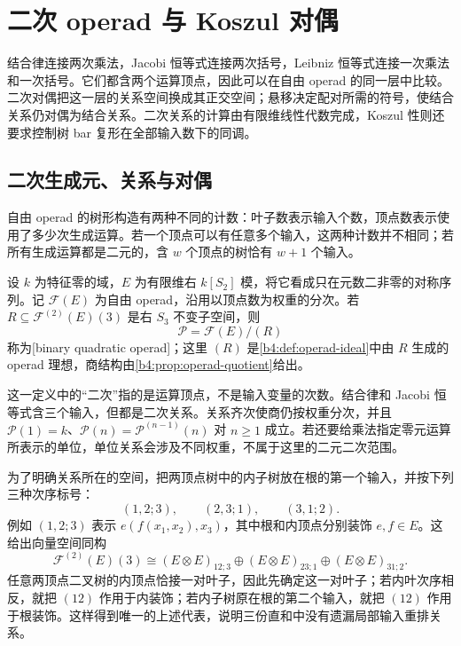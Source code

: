 
\section{二次 operad 与 Koszul 对偶}
\label{b4:sec:G03}

结合律连接两次乘法，Jacobi 恒等式连接两次括号，Leibniz 恒等式连接一次乘法和一次括号。它们都含两个运算顶点，因此可以在自由 operad 的同一层中比较。二次对偶把这一层的关系空间换成其正交空间；悬移决定配对所需的符号，使结合关系仍对偶为结合关系。二次关系的计算由有限维线性代数完成，Koszul 性则还要求控制树 bar 复形在全部输入数下的同调。

\subsection{二次生成元、关系与对偶}
\label{b4:subsec:G03:01}

自由 operad 的树形构造有两种不同的计数：叶子数表示输入个数，顶点数表示使用了多少次生成运算。若一个顶点可以有任意多个输入，这两种计数并不相同；若所有生成运算都是二元的，含 \(w\) 个顶点的树恰有 \(w+1\) 个输入。

\begin{definition}\label{b4:def:binary-quadratic-operad}
	设 \(k\) 为特征零的域，\(E\) 为有限维右 \(k[S_2]\) 模，将它看成只在元数二非零的对称序列。记 \(\mathcal F(E)\) 为自由 operad，沿用以顶点数为权重的分次。若 \(R\subseteq\mathcal F^{(2)}(E)(3)\) 是右 \(S_3\) 不变子空间，则
	\[
		\mathcal P=\mathcal F(E)/(R)
	\]
	称为[binary quadratic operad]；这里 \((R)\) 是\cref{b4:def:operad-ideal}中由 \(R\) 生成的 operad 理想，商结构由\cref{b4:prop:operad-quotient}给出。
\end{definition}

这一定义中的“二次”指的是运算顶点，不是输入变量的次数。结合律和 Jacobi 恒等式含三个输入，但都是二次关系。关系齐次使商仍按权重分次，并且 \(\mathcal P(1)=k\)、\(\mathcal P(n)=\mathcal P^{(n-1)}(n)\) 对 \(n\ge1\) 成立。若还要给乘法指定零元运算所表示的单位，单位关系会涉及不同权重，不属于这里的二元二次范围。

\ProseParagraphBreak
为了明确关系所在的空间，把两顶点树中的内子树放在根的第一个输入，并按下列三种次序标号：
\[
	(1,2;3),\qquad(2,3;1),\qquad(3,1;2).
\]
例如 \((1,2;3)\) 表示 \(e(f(x_1,x_2),x_3)\)，其中根和内顶点分别装饰 \(e,f\in E\)。这给出向量空间同构
\begin{equation}\label{b4:eq:binary-weight-two}
	\mathcal F^{(2)}(E)(3)\cong(E\otimes E)_{12;3}\oplus(E\otimes E)_{23;1}\oplus(E\otimes E)_{31;2}.
\end{equation}
任意两顶点二叉树的内顶点恰接一对叶子，因此先确定这一对叶子；若内叶次序相反，就把 \((12)\) 作用于内装饰；若内子树原在根的第二个输入，就把 \((12)\) 作用于根装饰。这样得到唯一的上述代表，说明三份直和中没有遗漏局部输入重排关系。

